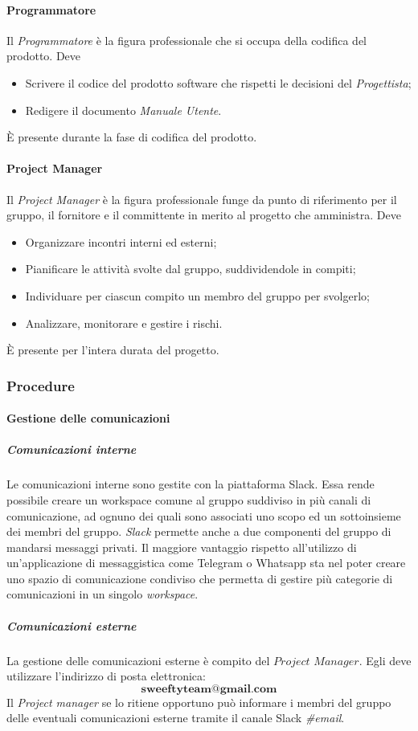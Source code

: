 		\paragraph{Programmatore} \Spazio
		Il \emph{Programmatore} è la figura professionale che si occupa della codifica del prodotto. Deve
		\begin{itemize}
			\item Scrivere il codice  del prodotto software che rispetti le decisioni del \emph{Progettista};
			\item Redigere il documento \emph{Manuale Utente}.
		\end{itemize}
		È presente durante la fase di codifica del prodotto.
		\paragraph{Project Manager} \Spazio
		Il \emph{Project Manager} è la figura professionale funge da punto di riferimento per il gruppo, il fornitore e il committente in merito al progetto che amministra. Deve
		\begin{itemize}
			\item Organizzare incontri interni ed esterni;
			\item Pianificare le attività svolte dal gruppo, suddividendole in compiti;
			\item Individuare per ciascun compito un membro del gruppo per svolgerlo;
			\item Analizzare, monitorare e gestire i rischi.
		\end{itemize}
		È presente per l'intera durata del progetto.
	\subsubsection{Procedure}
		\paragraph{Gestione delle comunicazioni}
			\subparagraph{Comunicazioni interne} \Spazio
			\label{comInterne}
			Le comunicazioni interne sono gestite con la piattaforma Slack. Essa rende possibile creare un workspace comune al gruppo suddiviso in più canali di comunicazione, ad ognuno dei quali sono associati uno scopo ed un sottoinsieme dei membri del gruppo. \emph{Slack} permette anche a due componenti del gruppo di mandarsi messaggi privati. Il maggiore vantaggio rispetto all'utilizzo di un'applicazione di messaggistica come Telegram o Whatsapp sta nel poter creare uno spazio di comunicazione condiviso che permetta di gestire più categorie di comunicazioni in un singolo \emph{workspace}. %
			\subparagraph{Comunicazioni esterne} \Spazio
			 La gestione delle comunicazioni esterne è compito del $Project$ $Manager$. Egli deve utilizzare l'indirizzo di posta elettronica:
			$$\textbf{sweeftyteam@gmail.com}$$
			Il \emph{Project manager} se lo ritiene opportuno può informare i membri del gruppo delle eventuali comunicazioni esterne tramite il canale Slack \emph{\#email}.
			

